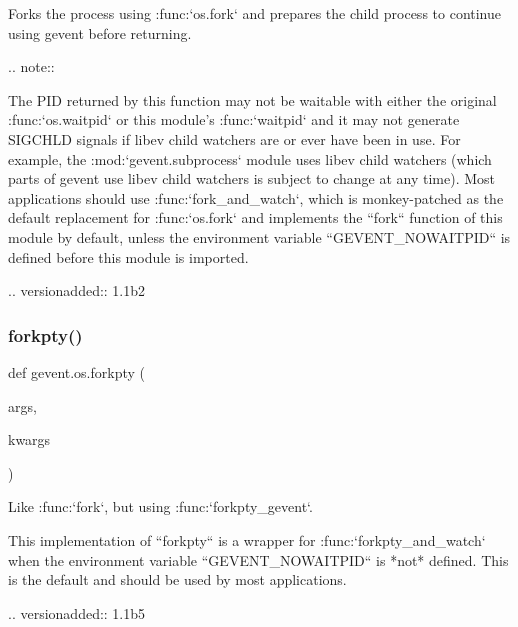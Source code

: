 \begin{DoxyVerb}Forks the process using :func:`os.fork` and prepares the
child process to continue using gevent before returning.

.. note::

    The PID returned by this function may not be waitable with
    either the original :func:`os.waitpid` or this module's
    :func:`waitpid` and it may not generate SIGCHLD signals if
    libev child watchers are or ever have been in use. For
    example, the :mod:`gevent.subprocess` module uses libev
    child watchers (which parts of gevent use libev child
    watchers is subject to change at any time). Most
    applications should use :func:`fork_and_watch`, which is
    monkey-patched as the default replacement for
    :func:`os.fork` and implements the ``fork`` function of
    this module by default, unless the environment variable
    ``GEVENT_NOWAITPID`` is defined before this module is
    imported.

.. versionadded:: 1.1b2
\end{DoxyVerb}
 \mbox{\label{namespacegevent_1_1os_a0301570240bde65a58985e2b60e15535}} 
\subsubsection{\texorpdfstring{forkpty()}{forkpty()}\hspace{0.1cm}{\footnotesize\ttfamily [1/2]}}
{\footnotesize\ttfamily def gevent.\+os.\+forkpty (\begin{DoxyParamCaption}\item[{}]{args,  }\item[{}]{kwargs }\end{DoxyParamCaption})}

\begin{DoxyVerb}Like :func:`fork`, but using :func:`forkpty_gevent`.

This implementation of ``forkpty`` is a wrapper for :func:`forkpty_and_watch`
when the environment variable ``GEVENT_NOWAITPID`` is *not* defined.
This is the default and should be used by most applications.

.. versionadded:: 1.1b5
\end{DoxyVerb}
 \mbox{\label{namespacegevent_1_1os_a050db0adfdcdc0616ac36b1d9874d494}} 
